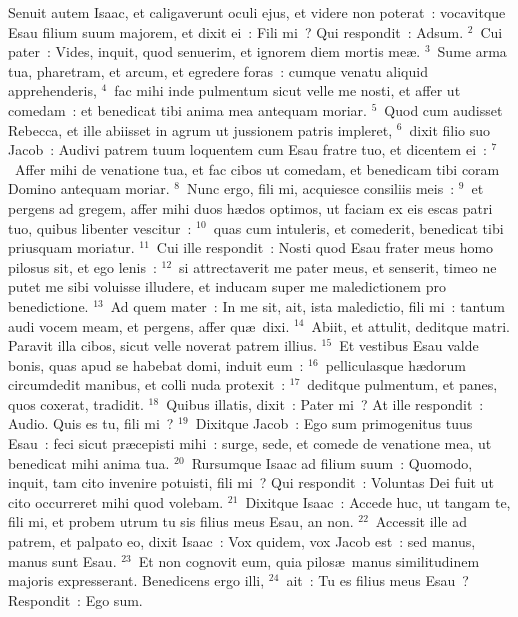 \lettrine[lines=3,image=true,loversize=0.05,lraise=-0.03]{S}{}enuit autem Isaac, et caligaverunt oculi ejus, et videre non poterat~: vocavitque Esau filium suum majorem, et dixit ei~: Fili mi~? Qui respondit~: Adsum.
${}^{2}$~Cui pater~: Vides, inquit, quod senuerim, et ignorem diem mortis me\ae .
${}^{3}$~Sume arma tua, pharetram, et arcum, et egredere foras~: cumque venatu aliquid apprehenderis,
${}^{4}$~fac mihi inde pulmentum sicut velle me nosti, et affer ut comedam~: et benedicat tibi anima mea antequam moriar.
${}^{5}$~Quod cum audisset Rebecca, et ille abiisset in agrum ut jussionem patris impleret,
${}^{6}$~dixit filio suo Jacob~: Audivi patrem tuum loquentem cum Esau fratre tuo, et dicentem ei~:
${}^{7}$~Affer mihi de venatione tua, et fac cibos ut comedam, et benedicam tibi coram Domino antequam moriar.
${}^{8}$~Nunc ergo, fili mi, acquiesce consiliis meis~:
${}^{9}$~et pergens ad gregem, affer mihi duos h\ae dos optimos, ut faciam ex eis escas patri tuo, quibus libenter vescitur~:
${}^{10}$~quas cum intuleris, et comederit, benedicat tibi priusquam moriatur.
${}^{11}$~Cui ille respondit~: Nosti quod Esau frater meus homo pilosus sit, et ego lenis~:
${}^{12}$~si attrectaverit me pater meus, et senserit, timeo ne putet me sibi voluisse illudere, et inducam super me maledictionem pro benedictione.
${}^{13}$~Ad quem mater~: In me sit, ait, ista maledictio, fili mi~: tantum audi vocem meam, et pergens, affer qu\ae\ dixi.
${}^{14}$~Abiit, et attulit, deditque matri. Paravit illa cibos, sicut velle noverat patrem illius.
${}^{15}$~Et vestibus Esau valde bonis, quas apud se habebat domi, induit eum~:
${}^{16}$~pelliculasque h\ae dorum circumdedit manibus, et colli nuda protexit~:
${}^{17}$~deditque pulmentum, et panes, quos coxerat, tradidit.
${}^{18}$~Quibus illatis, dixit~: Pater mi~? At ille respondit~: Audio. Quis es tu, fili mi~?
${}^{19}$~Dixitque Jacob~: Ego sum primogenitus tuus Esau~: feci sicut pr\ae cepisti mihi~: surge, sede, et comede de venatione mea, ut benedicat mihi anima tua.
${}^{20}$~Rursumque Isaac ad filium suum~: Quomodo, inquit, tam cito invenire potuisti, fili mi~? Qui respondit~: Voluntas Dei fuit ut cito occurreret mihi quod volebam.
${}^{21}$~Dixitque Isaac~: Accede huc, ut tangam te, fili mi, et probem utrum tu sis filius meus Esau, an non.
${}^{22}$~Accessit ille ad patrem, et palpato eo, dixit Isaac~: Vox quidem, vox Jacob est~: sed manus, manus sunt Esau.
${}^{23}$~Et non cognovit eum, quia pilos\ae\ manus similitudinem majoris expresserant. Benedicens ergo illi,
${}^{24}$~ait~: Tu es filius meus Esau~? Respondit~: Ego sum.
